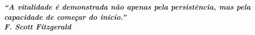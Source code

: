 \begin{epigrafe}
        \vspace*{\fill}
    	\hspace{\fill}
            \begin{minipage}{.5\textwidth}
            \fonteEpigrafe \begin{flushright}
    		\textbf{
    		\textit{
    		“A vitalidade é demonstrada não apenas pela persistência, mas pela capacidade de começar do início.”\\
    		F. Scott Fitzgerald
    		}}
    	    \end{flushright}
            \end{minipage}
\end{epigrafe}